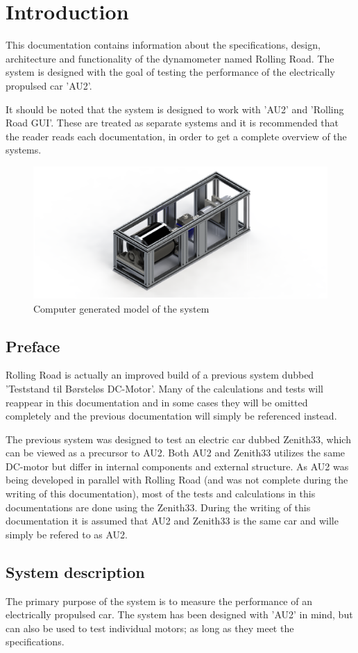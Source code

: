\chapter{Introduction}
This documentation contains information about the specifications, design, architecture and functionality of the dynamometer named Rolling Road. The system is designed with the goal of testing the performance of the electrically propulsed car 'AU2'.

It should be noted that the system is designed to work with 'AU2' and 'Rolling Road GUI'. These are treated as separate systems and it is recommended that the reader reads each documentation, in order to get a complete overview of the systems.

\begin{figure}[H]
	\centering
	\includegraphics[width=0.5\linewidth]{Introduction/Model}
	\caption{Computer generated model of the system}
	\label{fig:System_model}
\end{figure}

\section{Preface}
Rolling Road is actually an improved build of a previous system dubbed 'Teststand til Børsteløs
DC-Motor'\cite{BAC_rullefelt}. Many of the calculations and tests will reappear in this documentation and in some cases they will be omitted completely and the previous documentation will simply be referenced instead. 

The previous system was designed to test an electric car dubbed Zenith33\cite{BAC_zenith33}, which can be viewed as a precursor to AU2. Both AU2 and Zenith33 utilizes the same DC-motor but differ in internal components and external structure. As AU2 was being developed in parallel with Rolling Road (and was not complete during the writing of this documentation), most of the tests and calculations in this documentations are done using the Zenith33. During the writing of this documentation it is assumed that AU2 and Zenith33 is the same car and wille simply be refered to as AU2.

\newpage
\section{System description}
The primary purpose of the system is to measure the performance of an electrically propulsed car. The system has been designed with 'AU2' in mind, but can also be used to test individual motors; as long as they meet the specifications.

